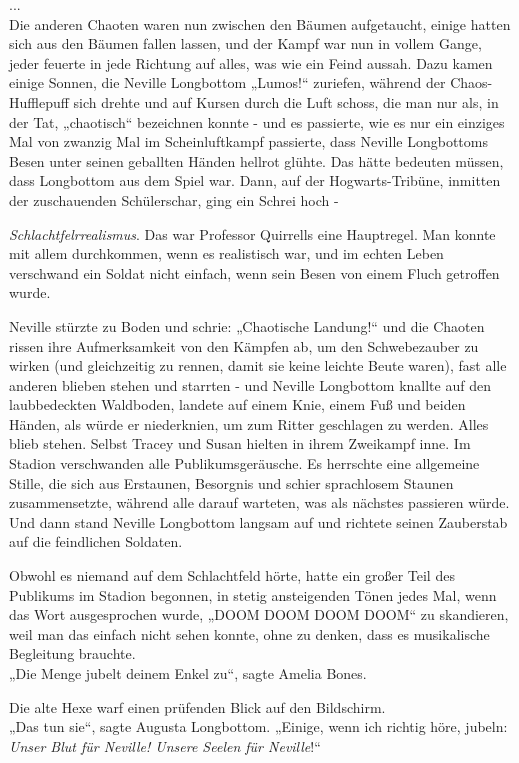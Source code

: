 {...\\ Die anderen Chaoten waren nun zwischen den Bäumen aufgetaucht, einige hatten sich aus den Bäumen fallen lassen, und der Kampf war nun in vollem Gange, jeder feuerte in jede Richtung auf alles, was wie ein Feind aussah. Dazu kamen einige Sonnen, die Neville Longbottom „Lumos!“ zuriefen, während der Chaos-Hufflepuff sich drehte und auf Kursen durch die Luft schoss, die man nur als, in der Tat, „chaotisch“ bezeichnen konnte - und es passierte, wie es nur ein einziges Mal von zwanzig Mal im Scheinluftkampf passierte, dass Neville Longbottoms Besen unter seinen geballten Händen hellrot glühte. Das hätte bedeuten müssen, dass Longbottom aus dem Spiel war. Dann, auf der Hogwarts-Tribüne, inmitten der zuschauenden Schülerschar, ging ein Schrei hoch -

\emph{Schlachtfelrrealismus}. Das war Professor Quirrells eine Hauptregel. Man konnte mit allem durchkommen, wenn es realistisch war, und im echten Leben verschwand ein Soldat nicht einfach, wenn sein Besen von einem Fluch getroffen wurde.

Neville stürzte zu Boden und schrie: „Chaotische Landung!“ und die Chaoten rissen ihre Aufmerksamkeit von den Kämpfen ab, um den Schwebezauber zu wirken (und gleichzeitig zu rennen, damit sie keine leichte Beute waren), fast alle anderen blieben stehen und starrten - und Neville Longbottom knallte auf den laubbedeckten Waldboden, landete auf einem Knie, einem Fuß und beiden Händen, als würde er niederknien, um zum Ritter geschlagen zu werden. Alles blieb stehen. Selbst Tracey und Susan hielten in ihrem Zweikampf inne. Im Stadion verschwanden alle Publikumsgeräusche. Es herrschte eine allgemeine Stille, die sich aus Erstaunen, Besorgnis und schier sprachlosem Staunen zusammensetzte, während alle darauf warteten, was als nächstes passieren würde. Und dann stand Neville Longbottom langsam auf und richtete seinen Zauberstab auf die feindlichen Soldaten.

Obwohl es niemand auf dem Schlachtfeld hörte, hatte ein großer Teil des Publikums im Stadion begonnen, in stetig ansteigenden Tönen jedes Mal, wenn das Wort ausgesprochen wurde, „DOOM DOOM DOOM DOOM“ zu skandieren, weil man das einfach nicht sehen konnte, ohne zu denken, dass es musikalische Begleitung brauchte.\\ „Die Menge jubelt deinem Enkel zu“, sagte Amelia Bones.

Die alte Hexe warf einen prüfenden Blick auf den Bildschirm.\\ „Das tun sie“, sagte Augusta Longbottom. „Einige, wenn ich richtig höre, jubeln: \emph{Unser Blut für Neville! Unsere Seelen für Neville}!“

}
